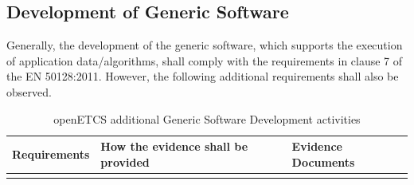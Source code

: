 \documentclass{template/openetcs_report}
\begin{document}
\subsection{Development of Generic Software}
\begin{flushleft}
Generally, the development of the generic software, which supports the execution of application data/algorithms, shall comply with the requirements in clause 7 of the EN 50128:2011. 
However, the following additional requirements shall also be observed.
\end{flushleft}
{\footnotesize\sffamily\centering
\begin{longtable}{|p{2cm}|p{9cm}|p{3cm}|}
\caption{openETCS additional Generic Software Development activities}\\
\hline
\bfseries Requirements & \bfseries How the evidence shall be provided & \bfseries Evidence Documents\\
\hline
\hline
\endhead
\hline
\endfoot


\end{longtable}}
\end{document}
